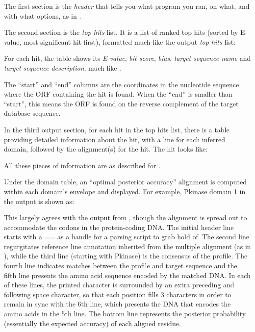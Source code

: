 The first section is the \emph{header} that tells you what program you
ran, on what, and with what options, as in .

The second section is the \emph{top hits} list. It is a list
of ranked top hits (sorted by E-value, most significant hit first),
formatted much like the  output \emph{top hits} list:

   
For each hit, the table shows its \emph{E-value}, \emph{bit score},
\emph{bias}, \emph{target sequence name} and \emph{target sequence
  description}, much like .

The ``start'' and ``end'' columns are the coordinates in the nucleotide
sequence where the ORF containing the hit is found. When the ``end'' is smaller
than ``start'', this means the ORF is found on the reverse complement of the
target database sequence.
   
In the third output section, for each hit in the top hits list, there 
is a table providing detailed information about the hit, with a line for 
each inferred domain, followed by the alignment(s) for the hit. 
The  hit looks like:
   

All these pieces of information are as described for . 

Under the domain table, an ``optimal posterior accuracy'' alignment
is computed within each domain's envelope and displayed. For example,
Pkinase domain 1 in the  
output is shown as:

      
This largely agrees with the output from , though 
the alignment is spread out to accommodate the codons in the
protein-coding DNA. The initial header line starts with a == 
as a handle for a parsing script to grab hold of. The second line
regurgitates reference line annotation inherited from the multiple
alignment (as in ), while the third line (starting 
with Pkinase) is the consensus of the profile. The fourth line 
indicates matches between the profile and target sequence and 
the fifth line presents the amino acid sequence encoded by the 
matched DNA.  In each of these lines, the printed character is 
surrounded by an extra preceding and following space character, 
so that each position fills 3 characters in order to remain in 
sync with the 6th line, which presents the DNA that encodes 
the amino acids in the 5th line. The bottom line
represents the posterior probability (essentially the expected 
accuracy) of each aligned residue.


